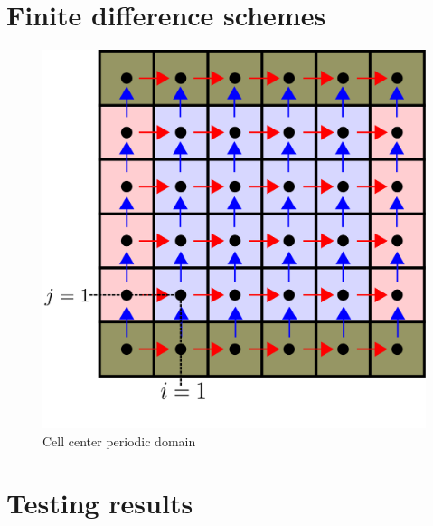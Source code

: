 \documentclass[12pt]{article}
\begin{document}
\section{Finite difference schemes}
    
    
    \newpage
    
    \begin{figure}[H]
        \includegraphics[height=0.5\textheight]{../../../media/periodic-BCs}
        \caption{Cell center periodic domain}
        \label{fig:periodic-domain}
    \end{figure}                                                            

\section{Testing results}

\end{document}
